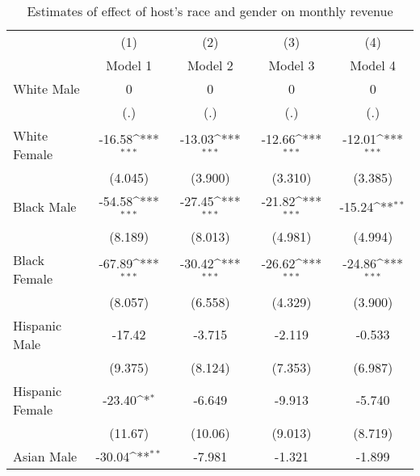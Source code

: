 {
\def\sym#1{\ifmmode^{#1}\else\(^{#1}\)\fi}
\begin{longtable}{l*{4}{c}}
\caption{Estimates of effect of host's race and gender on monthly revenue}\\
\hline\hline\endfirsthead\hline\endhead\hline\endfoot\endlastfoot
                    &\multicolumn{1}{c}{(1)}&\multicolumn{1}{c}{(2)}&\multicolumn{1}{c}{(3)}&\multicolumn{1}{c}{(4)}\\
                    &\multicolumn{1}{c}{Model 1}&\multicolumn{1}{c}{Model 2}&\multicolumn{1}{c}{Model 3}&\multicolumn{1}{c}{Model 4}\\
\hline
White Male          &           0         &           0         &           0         &           0         \\
                    &         (.)         &         (.)         &         (.)         &         (.)         \\
[1em]
White Female        &      -16.58\sym{***}&      -13.03\sym{***}&      -12.66\sym{***}&      -12.01\sym{***}\\
                    &     (4.045)         &     (3.900)         &     (3.310)         &     (3.385)         \\
[1em]
Black Male          &      -54.58\sym{***}&      -27.45\sym{***}&      -21.82\sym{***}&      -15.24\sym{**} \\
                    &     (8.189)         &     (8.013)         &     (4.981)         &     (4.994)         \\
[1em]
Black Female        &      -67.89\sym{***}&      -30.42\sym{***}&      -26.62\sym{***}&      -24.86\sym{***}\\
                    &     (8.057)         &     (6.558)         &     (4.329)         &     (3.900)         \\
[1em]
Hispanic Male       &      -17.42         &      -3.715         &      -2.119         &      -0.533         \\
                    &     (9.375)         &     (8.124)         &     (7.353)         &     (6.987)         \\
[1em]
Hispanic Female     &      -23.40\sym{*}  &      -6.649         &      -9.913         &      -5.740         \\
                    &     (11.67)         &     (10.06)         &     (9.013)         &     (8.719)         \\
[1em]
Asian Male          &      -30.04\sym{**} &      -7.981         &      -1.321         &      -1.899         \\

\end{longtable}}
